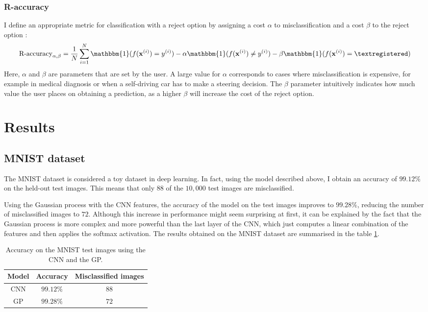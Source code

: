 \documentclass{article}
\begin{document}
\subsubsection{R-accuracy}
 I define an appropriate metric for classification with a reject option by assigning a cost $\alpha$ to misclassification and a cost $\beta$ to the reject option \textregistered:
\begin{equation*}
	\textrm{R-accuracy}_{\alpha, \beta} = \frac{1}{N} \sum_{i=1}^N \mathbbm{1}(f(\mathbf{x}^{(i)}) = y^{(i)}) - \alpha \mathbbm{1}(f(\mathbf{x}^{(i)}) \neq y^{(i)}) - \beta \mathbbm{1}(f(\mathbf{x}^{(i)}) = \textregistered)
\end{equation*}
Here, $\alpha$ and $\beta$ are parameters that are set by the user. A large value for $\alpha$ corresponds to cases where misclassification is expensive, for example in medical diagnosis or when a self-driving car has to make a steering decision. The $\beta$ parameter intuitively indicates how much value the user places on obtaining a prediction, as a higher $\beta$ will increase the cost of the reject option.

\section{Results}
\subsection{MNIST dataset}
The MNIST dataset is considered a toy dataset in deep learning. In fact, using the model described above, I obtain an accuracy of $99.12\%$ on the held-out test images. This means that only $88$ of the $10,000$ test images are misclassified.

Using the Gaussian process with the CNN features, the accuracy of the model on the test images improves to $99.28\%$, reducing the number of misclassified images to $72$. Although this increase in performance might seem surprising at first, it can be explained by the fact that the Gaussian process is more complex and more powerful than the last layer of the CNN, which just computes a linear combination of the features and then applies the softmax activation. The results obtained on the MNIST dataset are summarised in the table \ref{table/mnist_acc}.

\begin{table}[h]
\centering	
{\renewcommand{\arraystretch}{1.2} %
\begin{tabular}{ c | c c}
\textbf{Model} & \textbf{Accuracy} & \textbf{Misclassified images}\\
\hline
CNN & $99.12\%$ & $88$ \\
GP & $99.28\%$  & $72$\\
\end{tabular}
}
\caption{Accuracy on the MNIST test images using the CNN and the GP.}
\label{table/mnist_acc}
\end{table}
\end{document}
